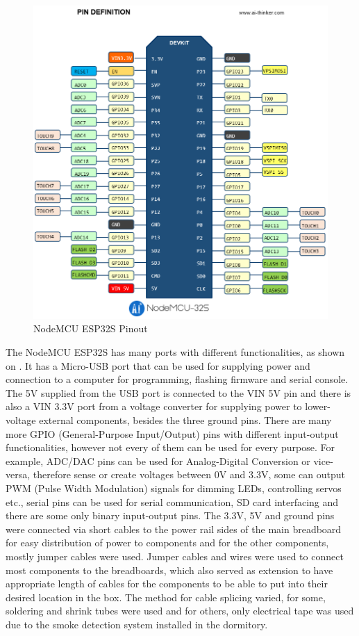 \begin{figure}[!ht]
    \centering
    \includegraphics[width=150mm, keepaspectratio]{figures/nodemcu_32s_pinout.png}
    \caption{NodeMCU ESP32S Pinout}
    \label{fig:NodeMCU32Pinout}
\end{figure}

The NodeMCU ESP32S has many ports with different functionalities, as shown on . \cite{AIThinkerNodeMCU32} It has a Micro-USB port that can be used for supplying power and connection to a computer for programming, flashing firmware and serial console. The 5V supplied from the USB port is connected to the VIN 5V pin and there is also a VIN 3.3V port from a voltage converter for supplying power to lower-voltage external components, besides the three ground pins. There are many more GPIO (General-Purpose Input/Output) pins with different input-output functionalities, however not every of them can be used for every purpose. For example, ADC/DAC pins can be used for Analog-Digital Conversion or vice-versa, therefore sense or create voltages between 0V and 3.3V, some can output PWM (Pulse Width Modulation) signals for dimming LEDs, controlling servos etc., serial pins can be used for serial communication, SD card interfacing and there are some only binary input-output pins. The 3.3V, 5V and ground pins were connected via short cables to the power rail sides of the main breadboard for easy distribution of power to components and for the other components, mostly jumper cables were used. Jumper cables and wires were used to connect most components to the breadboards, which also served as extension to have appropriate length of cables for the components to be able to put into their desired location in the box. The method for cable splicing varied, for some, soldering and shrink tubes were used and for others, only electrical tape was used due to the smoke detection system installed in the dormitory.

